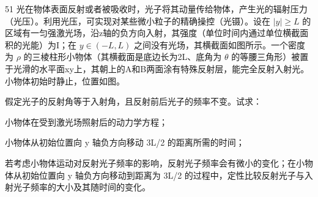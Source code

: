 \begin{problem}[第32届全国中学生物理竞赛决赛]{51}
光在物体表面反射或者被吸收时，光子将其动量传给物体，产生光的辐射压力（光压）。利用光压，可实现对某些微小粒子的精确操控（光镊）。设在 $|y|\geq L$ 的区域有一匀强激光场，沿z轴的负方向入射，其强度（单位时间内通过单位横截面积的光能）为I；在 $y\in(-L,L)$ 之间没有光场，其横截面如图所示。一个密度为 $\rho$ 的三棱柱形小物体（其横截面是底边长为2L、底角为 $\theta$ 的等腰三角形）被置于光滑的水平面xy上，其朝上的A和B两面涂有特殊反射层，能完全反射入射光。小物体初始时静止，位置如图。
\begin{subproblem}
假定光子的反射角等于入射角，且反射前后光子的频率不变。试求：
\begin{subsubproblem}
小物体在受到激光场照射后的动力学方程；
\end{subsubproblem}
\begin{subsubproblem}
小物体从初始位置向 y 轴负方向移动 3L/2 的距离所需的时间；
\end{subsubproblem}
\end{subproblem}
\begin{subproblem}
若考虑小物体运动对反射光子频率的影响，反射光子频率会有微小的变化；在小物体从初始位置向 y 轴负方向移动到距离为 3L/2 的过程中，定性比较反射光子与入射光子频率的大小及其随时间的变化。
\end{subproblem}
\end{problem}